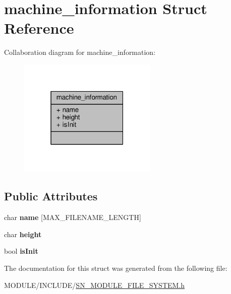 \hypertarget{structmachine__information}{}\section{machine\+\_\+information Struct Reference}
\label{structmachine__information}


Collaboration diagram for machine\+\_\+information\+:\nopagebreak
\begin{figure}[H]
\begin{center}
\leavevmode
\includegraphics[width=187pt]{structmachine__information__coll__graph}
\end{center}
\end{figure}
\subsection*{Public Attributes}
\begin{DoxyCompactItemize}
\item 
\mbox{\label{structmachine__information_ab98ac9579a14ca6351a586f6fe71aa7d}} 
char {\bfseries name} \mbox{[}M\+A\+X\+\_\+\+F\+I\+L\+E\+N\+A\+M\+E\+\_\+\+L\+E\+N\+G\+TH\mbox{]}
\item 
\mbox{\label{structmachine__information_afefc7bdff98f1d03477ac6f4175c65be}} 
char {\bfseries height}
\item 
\mbox{\label{structmachine__information_a2e4f3a82636bc57169cc5fcd3e9266ab}} 
bool {\bfseries is\+Init}
\end{DoxyCompactItemize}


The documentation for this struct was generated from the following file\+:\begin{DoxyCompactItemize}
\item 
M\+O\+D\+U\+L\+E/\+I\+N\+C\+L\+U\+D\+E/\hyperlink{SN__MODULE__FILE__SYSTEM_8h}{S\+N\+\_\+\+M\+O\+D\+U\+L\+E\+\_\+\+F\+I\+L\+E\+\_\+\+S\+Y\+S\+T\+E\+M.\+h}\end{DoxyCompactItemize}
